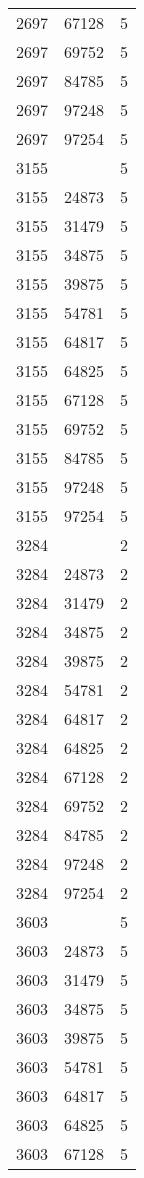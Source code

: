 {{\begin{tabular}{|c|c||c|}
2697&67128&5\\ 2697&69752&5\\ 2697&84785&5\\ 2697&97248&5\\ 2697&97254&5\\ 3155& &5\\ 3155&24873&5\\ 3155&31479&5\\ 3155&34875&5\\ 3155&39875&5\\ 3155&54781&5\\ 3155&64817&5\\ 3155&64825&5\\ 3155&67128&5\\ 3155&69752&5\\ 3155&84785&5\\ 3155&97248&5\\ 3155&97254&5\\ 3284& &2\\ 3284&24873&2\\ 3284&31479&2\\ 3284&34875&2\\ 3284&39875&2\\ 3284&54781&2\\ 3284&64817&2\\ 3284&64825&2\\ 3284&67128&2\\ 3284&69752&2\\ 3284&84785&2\\ 3284&97248&2\\ 3284&97254&2\\ 3603& &5\\ 3603&24873&5\\ 3603&31479&5\\ 3603&34875&5\\ 3603&39875&5\\ 3603&54781&5\\ 3603&64817&5\\ 3603&64825&5\\ 3603&67128&5\\ 
        \hline
        \end{tabular}
    }
}

